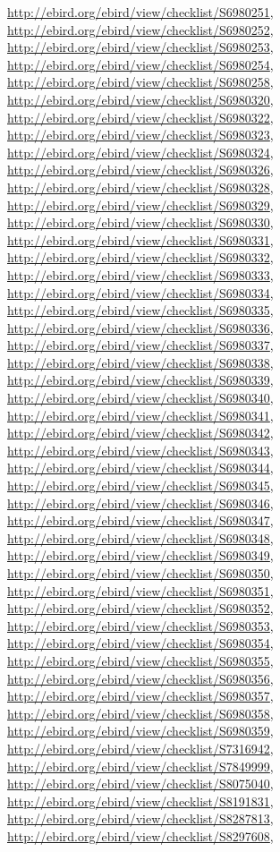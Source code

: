 \documentclass[9pt, article]{memoir}
\begin{document}
\begin{multicols}{2}
\url{http://ebird.org/ebird/view/checklist/S6980251}, 
\url{http://ebird.org/ebird/view/checklist/S6980252}, 
\url{http://ebird.org/ebird/view/checklist/S6980253}, 
\url{http://ebird.org/ebird/view/checklist/S6980254}, 
\url{http://ebird.org/ebird/view/checklist/S6980258}, 
\url{http://ebird.org/ebird/view/checklist/S6980320}, 
\url{http://ebird.org/ebird/view/checklist/S6980322}, 
\url{http://ebird.org/ebird/view/checklist/S6980323}, 
\url{http://ebird.org/ebird/view/checklist/S6980324}, 
\url{http://ebird.org/ebird/view/checklist/S6980326}, 
\url{http://ebird.org/ebird/view/checklist/S6980328}, 
\url{http://ebird.org/ebird/view/checklist/S6980329}, 
\url{http://ebird.org/ebird/view/checklist/S6980330}, 
\url{http://ebird.org/ebird/view/checklist/S6980331}, 
\url{http://ebird.org/ebird/view/checklist/S6980332}, 
\url{http://ebird.org/ebird/view/checklist/S6980333}, 
\url{http://ebird.org/ebird/view/checklist/S6980334}, 
\url{http://ebird.org/ebird/view/checklist/S6980335}, 
\url{http://ebird.org/ebird/view/checklist/S6980336}, 
\url{http://ebird.org/ebird/view/checklist/S6980337}, 
\url{http://ebird.org/ebird/view/checklist/S6980338}, 
\url{http://ebird.org/ebird/view/checklist/S6980339}, 
\url{http://ebird.org/ebird/view/checklist/S6980340}, 
\url{http://ebird.org/ebird/view/checklist/S6980341}, 
\url{http://ebird.org/ebird/view/checklist/S6980342}, 
\url{http://ebird.org/ebird/view/checklist/S6980343}, 
\url{http://ebird.org/ebird/view/checklist/S6980344}, 
\url{http://ebird.org/ebird/view/checklist/S6980345}, 
\url{http://ebird.org/ebird/view/checklist/S6980346}, 
\url{http://ebird.org/ebird/view/checklist/S6980347}, 
\url{http://ebird.org/ebird/view/checklist/S6980348}, 
\url{http://ebird.org/ebird/view/checklist/S6980349}, 
\url{http://ebird.org/ebird/view/checklist/S6980350}, 
\url{http://ebird.org/ebird/view/checklist/S6980351}, 
\url{http://ebird.org/ebird/view/checklist/S6980352}, 
\url{http://ebird.org/ebird/view/checklist/S6980353}, 
\url{http://ebird.org/ebird/view/checklist/S6980354}, 
\url{http://ebird.org/ebird/view/checklist/S6980355}, 
\url{http://ebird.org/ebird/view/checklist/S6980356}, 
\url{http://ebird.org/ebird/view/checklist/S6980357}, 
\url{http://ebird.org/ebird/view/checklist/S6980358}, 
\url{http://ebird.org/ebird/view/checklist/S6980359}, 
\url{http://ebird.org/ebird/view/checklist/S7316942}, 
\url{http://ebird.org/ebird/view/checklist/S7849999}, 
\url{http://ebird.org/ebird/view/checklist/S8075040}, 
\url{http://ebird.org/ebird/view/checklist/S8191831}, 
\url{http://ebird.org/ebird/view/checklist/S8287813}, 
\url{http://ebird.org/ebird/view/checklist/S8297608}, 

\end{multicols}
\end{document}
